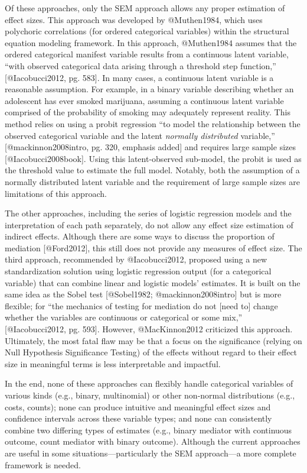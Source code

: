 \documentclass[]{article}
\begin{document}
Of these approaches, only the SEM approach allows any proper estimation
of effect sizes. This approach was developed by @Muthen1984, which uses
polychoric correlations (for ordered categorical variables) within the
structural equation modeling framework. In this approach, @Muthen1984
assumes that the ordered categorical manifest variable results from a
continuous latent variable, ``with observed categorical data arising
through a threshold step function,'' {[}@Iacobucci2012, pg. 583{]}. In
many cases, a continuous latent variable is a reasonable assumption. For
example, in a binary variable describing whether an adolescent has ever
smoked marijuana, assuming a continuous latent variable comprised of the
probability of smoking may adequately represent reality. This method
relies on using a probit regression ``to model the relationship between
the observed categorical variable and the latent \emph{normally
distributed} variable,'' {[}@mackinnon2008intro, pg. 320, emphasis
added{]} and requires large sample sizes {[}@Iacobucci2008book{]}. Using
this latent-observed sub-model, the probit is used as the threshold
value to estimate the full model. Notably, both the assumption of a
normally distributed latent variable and the requirement of large sample
sizes are limitations of this approach.

The other approaches, including the series of logistic regression models
and the interpretation of each path separately, do not allow any effect
size estimation of indirect effects. Although there are some ways to
discuss the proportion of mediation {[}@Ford2012{]}, this still does not
provide any measures of effect size. The third approach, recommended by
@Iacobucci2012, proposed using a new standardization solution using
logistic regression output (for a categorical variable) that can combine
linear and logistic models' estimates. It is built on the same idea as
the Sobel test {[}@Sobel1982; @mackinnon2008intro{]} but is more
flexible; for ``the mechanics of testing for mediation do not {[}need
to{]} change whether the variables are continuous or categorical or some
mix,'' {[}@Iacobucci2012, pg. 593{]}. However, @MacKinnon2012 criticized
this approach. Ultimately, the most fatal flaw may be that a focus on
the significance (relying on Null Hypothesis Significance Testing) of
the effects without regard to their effect size in meaningful terms is
less interpretable and impactful.

In the end, none of these approaches can flexibly handle categorical
variables of various kinds (e.g., binary, multinomial) or other
non-normal distributions (e.g., costs, counts); none can produce
intuitive and meaningful effect sizes and confidence intervals across
these variable types; and none can consistently combine two differing
types of estimates (e.g., binary mediator with continuous outcome, count
mediator with binary outcome). Although the current approaches are
useful in some situations---particularly the SEM approach---a more
complete framework is needed.
\end{document}

